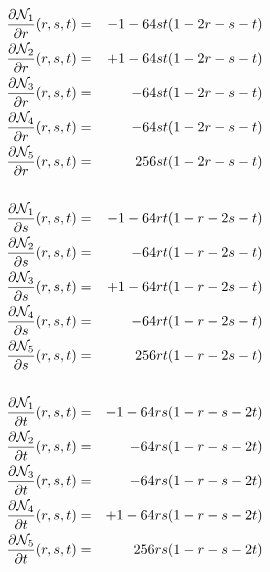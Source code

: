 \begin{eqnarray}
\frac{\partial {\mathcal{N}}_1}{\partial r}(r,s,t) &=& -1 - 64st(1-2r-s-t) \nonumber\\
\frac{\partial {\mathcal{N}}_2}{\partial r}(r,s,t) &=& +1 - 64st(1-2r-s-t) \nonumber\\
\frac{\partial {\mathcal{N}}_3}{\partial r}(r,s,t) &=&    - 64st(1-2r-s-t) \nonumber\\
\frac{\partial {\mathcal{N}}_4}{\partial r}(r,s,t) &=&    - 64st(1-2r-s-t) \nonumber\\
\frac{\partial {\mathcal{N}}_5}{\partial r}(r,s,t) &=&     256st(1-2r-s-t) \nonumber\\ \nonumber\\ 
\frac{\partial {\mathcal{N}}_1}{\partial s}(r,s,t) &=& -1 - 64rt(1-r-2s-t) \nonumber\\
\frac{\partial {\mathcal{N}}_2}{\partial s}(r,s,t) &=&    - 64rt(1-r-2s-t) \nonumber\\
\frac{\partial {\mathcal{N}}_3}{\partial s}(r,s,t) &=& +1 - 64rt(1-r-2s-t) \nonumber\\
\frac{\partial {\mathcal{N}}_4}{\partial s}(r,s,t) &=&    - 64rt(1-r-2s-t) \nonumber\\
\frac{\partial {\mathcal{N}}_5}{\partial s}(r,s,t) &=&     256rt(1-r-2s-t) \nonumber\\ \nonumber\\ 
\frac{\partial {\mathcal{N}}_1}{\partial t}(r,s,t) &=& -1 - 64rs(1-r-s-2t) \nonumber\\
\frac{\partial {\mathcal{N}}_2}{\partial t}(r,s,t) &=&    - 64rs(1-r-s-2t) \nonumber\\
\frac{\partial {\mathcal{N}}_3}{\partial t}(r,s,t) &=&    - 64rs(1-r-s-2t) \nonumber\\
\frac{\partial {\mathcal{N}}_4}{\partial t}(r,s,t) &=& +1 - 64rs(1-r-s-2t) \nonumber\\
\frac{\partial {\mathcal{N}}_5}{\partial t}(r,s,t) &=&     256rs(1-r-s-2t) \nonumber
\end{eqnarray}
